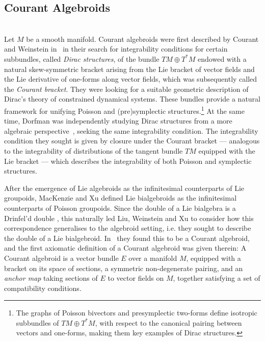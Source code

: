 \documentclass[a4paper, reqno, 11pt]{amsart}
\numberwithin{equation}{section}
\theoremstyle{definition}
\theoremstyle{remark}
\begin{document}
\subsection{Courant Algebroids}~\\[5pt]
\label{sub:CAhistory}
Let $M$ be a smooth manifold. Courant algebroids were first described by Courant and Weinstein in~\cite{courant1988beyond,Courant1990} in their search for integrability conditions for certain subbundles, called \emph{Dirac structures}, of the bundle $TM \oplus T^*M$ endowed with a natural skew-symmetric bracket arising from the Lie bracket of vector fields and the Lie derivative of one-forms along vector fields, which was subsequently called the \emph{Courant bracket}.
They were looking for a suitable geometric description of Dirac's theory of constrained dynamical systems. 
These bundles provide a natural framework for unifying Poisson and (pre)symplectic structures.\footnote{The graphs of Poisson bivectors and presymplectic two-forms define isotropic subbundles of $TM\oplus T^*M$, with respect to the canonical pairing between vectors and one-forms, making them key examples of  Dirac structures.} At the same time,  Dorfman was independently studying Dirac structures from a more algebraic perspective~\cite{dorfman1987dirac}, seeking the same integrability condition. The integrability condition they sought is given by closure under the Courant bracket --- analogous to the integrability of distributions of the tangent bundle $TM$ equipped with the Lie bracket --- which describes the integrability of both Poisson and symplectic structures.

After the emergence of Lie algebroids as the infinitesimal counterparts of Lie groupoids, MacKenzie and Xu \cite{mackenzie1994lie} defined  Lie bialgebroids as the infinitesimal counterparts of Poisson groupoids. Since the double of a Lie bialgebra is a Drinfel'd double \cite{drinfel1988quantum}, this naturally led Liu, Weinstein and Xu to consider how this correspondence generalises to the algebroid setting, i.e. they sought to describe the double of a Lie bialgebroid. In~\cite{Weinstein1997} they found this to be a Courant algebroid, and the first axiomatic definition of a Courant algebroid was given therein: A Courant algebroid is a vector bundle $E$ over a manifold $M$, equipped with a bracket on its space of sections, a symmetric non-degenerate pairing, and an \emph{anchor map} taking sections of $E$ to vector fields on $M$, together satisfying a  set of compatibility conditions.
\end{document}
